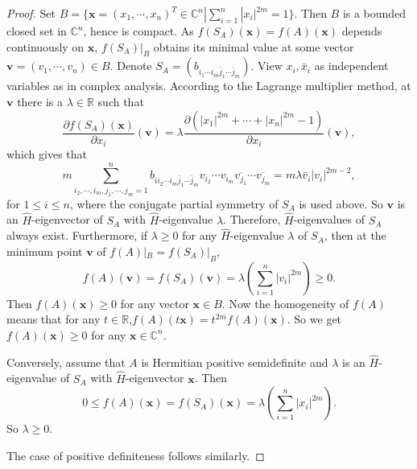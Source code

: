 \documentclass[10pt,reqno]{amsart}
\theoremstyle{definition}
\begin{document}
\begin{proof}
Set $B=\{\mathbf{x}=(x_1,\cdots, x_n)^T\in \mathbb C^n |\sum_{i=1}^{n}|x_i|^{2m}=1\}$. Then $B$ is a bounded closed set in $\mathbb C^n$, hence is compact. As $f(S_{A})(\mathbf{x})=f(A)(\mathbf{x})$ depends continuously on $\mathbf{x}$, $f(S_{A})|_B$ obtains its minimal value at some vector $\mathbf{v}=(v_1, \cdots, v_n)\in B$. Denote $S_{A}=(b_{i_1\cdots i_m\bar{j}_1\cdots \bar{j}_m})$. 
View $x_i, \bar{x}_i$ as independent variables as in complex analysis. According to the Lagrange multiplier method, at $\mathbf{v}$ there is a $\lambda\in \mathbb R$ such that
$$\dfrac{\partial f(S_{A})(\mathbf{x})}{\partial x_i}(\mathbf{v})=\lambda \dfrac{\partial (|x_1|^{2m}+\cdots+|x_n|^{2m}-1)}{\partial x_i}(\mathbf{v}),$$
which gives that 
$$m\sum_{i_2,\cdots, i_m, j_1, \cdots, j_m=1}^nb_{ii_2\cdots i_m\bar{j}_1\cdots \bar{j}_m}v_{i_2}\cdots v_{i_m}\overline{v_{j_1}}\cdots \overline{v_{j_m}}=m\lambda \bar{v}_{i} |v_{i}|^{2m-2},$$
for $1\leq i\leq n$, where the conjugate partial symmetry of $S_{A}$ is used above. So $\mathbf{v}$ is an $\hat{H}$-eigenvector of $S_{A}$ with $\hat{H}$-eigenvalue $\lambda$. Therefore, $\hat{H}$-eigenvalues of $S_{A}$ always exist. Furthermore, if $\lambda\geq 0$ for any $\hat{H}$-eigenvalue $\lambda$ of $S_{A}$, then at the minimum point $\mathbf{v}$ of $f(A)|_B=f(S_{A})|_B$, $$f(A)(\mathbf{v})=f(S_{A})(\mathbf{v})=\lambda(\sum_{i=1}^n|v_{i}|^{2m})\geq 0.$$ 
 Then $f(A)(\mathbf{x})\geq 0$ for any vector $\mathbf{x}\in B$. Now the homogeneity of $f(A)$ means that for any $t\in \mathbb R$,$f(A)(t\mathbf{x})=t^{2m}f(A)(\mathbf{x})$. So we get $f(A)(\mathbf{x})\geq 0$ for any $\mathbf{x}\in \mathbb C^n$.
	
Conversely, assume that $A$ is Hermitian positive semidefinite and $\lambda$ is an $\hat{H}$-eigenvalue of $S_{A}$ with $\hat{H}$-eigenvector $\mathbf{x}$. Then $$0\leq f(A)(\mathbf{x})=f(S_{A})(\mathbf{x})=\lambda(\sum_{i=1}^n|x_{i}|^{2m}).$$ So $\lambda\geq 0$. 

 The case of positive definiteness follows similarly.
\end{proof}
 
\end{document}
